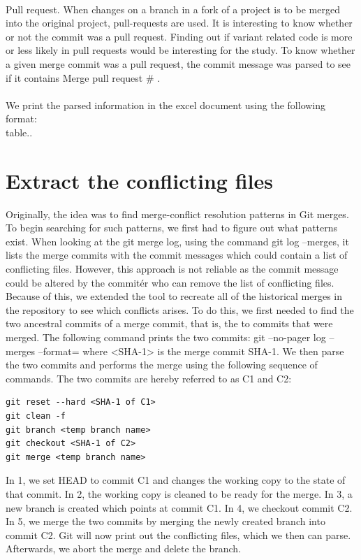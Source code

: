 \paragraph*{}
Pull request. When changes on a branch in a fork of a project is to be merged into the original project, pull-requests are used. It is interesting to know whether or not the commit was a pull request. Finding out if variant related code is more or less likely in pull requests would be interesting for the study. To know whether a given merge commit was a pull request, the commit message was parsed to see if it contains Merge pull request \# .
\paragraph*{}
We print the parsed information in the excel document using the following format:\\
table..
\section{Extract the conflicting files}
Originally, the idea was to find merge-conflict resolution patterns in Git merges. To begin searching for such patterns, we first had to figure out what patterns exist. When looking at the git merge log, using the command git log --merges, it lists the merge commits with the commit messages which could contain a list of conflicting files. However, this approach is not reliable as the commit message could be altered by the commitér who can remove the list of conflicting files. Because of this, we extended the tool to recreate all of the historical merges in the repository to see which conflicts arises. To do this, we first needed to find the two ancestral commits of a merge commit, that is, the to commits that were merged. The following command prints the two commits:
git --no-pager log --merges --format=%
where <SHA-1> is the merge commit SHA-1. We then parse the two commits and performs the merge using the following sequence of commands. The two commits are hereby referred to as C1 and C2:\\
\lstset{language=Bash}
\begin{lstlisting}[frame=single]
git reset --hard <SHA-1 of C1>
git clean -f
git branch <temp branch name>
git checkout <SHA-1 of C2>
git merge <temp branch name>
\end{lstlisting}
In 1, we set HEAD to commit C1 and changes the working copy to the state of that commit. In 2,  the working copy is cleaned to be ready for the merge. In 3, a new branch is created which points at commit C1. In 4, we checkout commit C2. In 5, we merge the two commits by merging the newly created branch into commit C2. Git will now print out the conflicting files, which we then can parse. Afterwards, we abort the merge and delete the branch.
